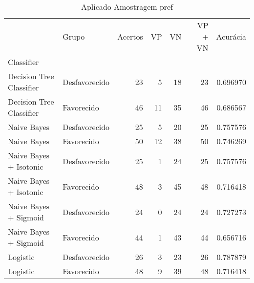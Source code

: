 \begin{table}
\centering
\caption{Aplicado Amostragem pref}
\label{Aplicado Amostragem pref 5}
\begin{tabular}{llrrrrr}
\toprule
{} &          Grupo &  Acertos &  VP  &  VN  &  VP + VN  &  Acurácia \\
Classifier               &                &          &      &      &           &           \\
\midrule
Decision Tree Classifier &  Desfavorecido &       23 &    5 &   18 &        23 &  0.696970 \\
Decision Tree Classifier &     Favorecido &       46 &   11 &   35 &        46 &  0.686567 \\
Naive Bayes              &  Desfavorecido &       25 &    5 &   20 &        25 &  0.757576 \\
Naive Bayes              &     Favorecido &       50 &   12 &   38 &        50 &  0.746269 \\
Naive Bayes + Isotonic   &  Desfavorecido &       25 &    1 &   24 &        25 &  0.757576 \\
Naive Bayes + Isotonic   &     Favorecido &       48 &    3 &   45 &        48 &  0.716418 \\
Naive Bayes + Sigmoid    &  Desfavorecido &       24 &    0 &   24 &        24 &  0.727273 \\
Naive Bayes + Sigmoid    &     Favorecido &       44 &    1 &   43 &        44 &  0.656716 \\
Logistic                 &  Desfavorecido &       26 &    3 &   23 &        26 &  0.787879 \\
Logistic                 &     Favorecido &       48 &    9 &   39 &        48 &  0.716418 \\
\bottomrule
\end{tabular}
\end{table}
